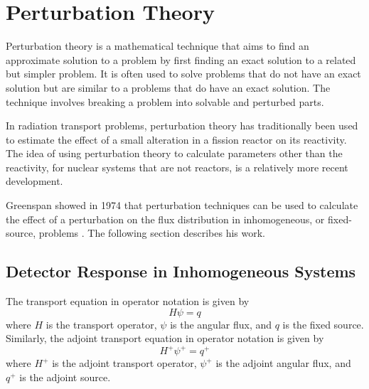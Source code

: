 \section{Perturbation Theory}
\label{sec:bg:pert}

Perturbation theory is a mathematical technique that aims to find an approximate solution to a problem by first finding an exact solution to a related but simpler problem.
It is often used to solve problems that do not have an exact solution but are similar to a problems that do have an exact solution.
The technique involves breaking a problem into solvable and perturbed parts.

In radiation transport problems, perturbation theory has traditionally been used to estimate the effect of a small alteration in a fission reactor on its reactivity.
The idea of using perturbation theory to calculate parameters other than the reactivity, for nuclear systems that are not reactors, is a relatively more recent development.

Greenspan showed in 1974 that perturbation techniques can be used to calculate the effect of a perturbation on the flux distribution in inhomogeneous, or fixed-source, problems \cite{greenspan}. The following section describes his work.

\subsection{Detector Response in Inhomogeneous Systems}
\label{sec:bg:pert:greenspan}

The transport equation in operator notation is given by
\begin{equation}\label{eq:bg:pt:green29}
  H\psi = q
\end{equation}
where $H$ is the transport operator, $\psi$ is the angular flux, and $q$ is the fixed source.
Similarly, the adjoint transport equation in operator notation is given by
\begin{equation}\label{eq:bg:pt:green163}
  H^+\psi^+ = q^+
\end{equation}
where $H^+$ is the adjoint transport operator, $\psi^+$ is the adjoint angular flux, and $q^+$ is the adjoint source.

